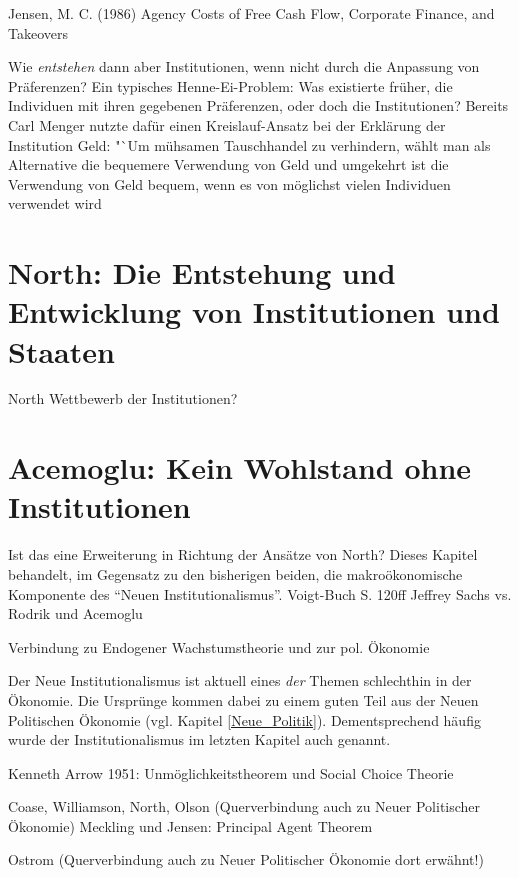 Jensen, M. C. (1986) Agency Costs of Free Cash Flow, Corporate Finance, and Takeovers


 Wie \textit{entstehen} dann aber Institutionen, wenn nicht durch die Anpassung von Präferenzen? Ein typisches Henne-Ei-Problem: Was existierte früher, die Individuen mit ihren gegebenen Präferenzen, oder doch die Institutionen? Bereits Carl Menger nutzte dafür einen Kreislauf-Ansatz bei der Erklärung der Institution Geld: "`Um mühsamen Tauschhandel zu verhindern, wählt man als Alternative die bequemere Verwendung von Geld und umgekehrt ist die Verwendung von Geld bequem, wenn es von möglichst vielen Individuen verwendet wird \parencite[S.176]{Hodgson1998}



\section{North: Die Entstehung und Entwicklung von Institutionen und Staaten}
North
Wettbewerb der Institutionen?



\section{Acemoglu: Kein Wohlstand ohne Institutionen}

Ist das eine Erweiterung in Richtung der Ansätze von North?
Dieses Kapitel behandelt, im Gegensatz zu den bisherigen beiden, die makroökonomische Komponente des "`Neuen Institutionalismus"'. 
Voigt-Buch S. 120ff
Jeffrey Sachs vs. Rodrik und Acemoglu



Verbindung zu Endogener Wachstumstheorie \textcite[S. 633ff]{Snowdon2005} und zur pol. Ökonomie \textcite[S. 562]{Snowdon2005}

Der Neue Institutionalismus ist aktuell eines \textit{der} Themen schlechthin in der Ökonomie. Die Ursprünge kommen dabei zu einem guten Teil aus der Neuen Politischen Ökonomie (vgl. Kapitel \ref{Neue_Politik}). Dementsprechend häufig wurde der Institutionalismus im letzten Kapitel auch genannt.





Kenneth Arrow 1951: Unmöglichkeitstheorem und Social Choice Theorie




Coase, Williamson, North, Olson (Querverbindung auch zu Neuer Politischer Ökonomie)
Meckling und Jensen: Principal Agent Theorem



Ostrom (Querverbindung auch zu Neuer Politischer Ökonomie dort erwähnt!)



